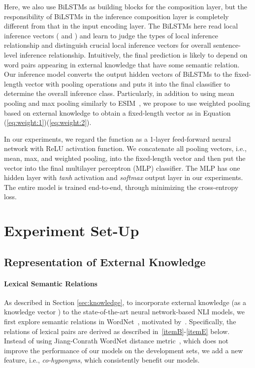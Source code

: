 \documentclass[11pt,a4paper]{article}
\begin{document}
Here, we also use BiLSTMs as building blocks for the composition layer, but the responsibility of BiLSTMs in the inference composition layer is completely different from that in the input encoding layer. The BiLSTMs here read local inference vectors ( and ) and learn to judge the types of local inference relationship and distinguish crucial local inference vectors for overall sentence-level inference relationship. Intuitively, the final prediction is likely to depend on word pairs appearing in external knowledge that have some semantic relation.
Our inference model converts the output hidden vectors of BiLSTMs to the fixed-length vector with pooling operations and puts it into the final classifier to determine the overall inference class. Particularly, in addition to using mean pooling and max pooling similarly to ESIM~\citep{DBLP:conf/acl/ChenZLWJI17}, we propose to use weighted pooling based on external knowledge to obtain a fixed-length vector as in Equation (\ref{eq:weight:1})(\ref{eq:weight:2}).  
{\fontsize{10pt}{1.0cm}

}
In our experiments, we regard the function  as a 1-layer feed-forward neural network with ReLU activation function. We concatenate all pooling vectors, i.e., mean, max, and weighted pooling, into the fixed-length vector and then put the vector into the final multilayer perceptron (MLP) classifier. The MLP has one hidden layer with \textit{tanh} activation and \textit{softmax} output layer in our experiments. The entire model is trained end-to-end, through minimizing the cross-entropy loss. 

\section{Experiment Set-Up}
\label{sec:setup}
\subsection{Representation of External Knowledge}
\paragraph{Lexical Semantic Relations} As described in Section \ref{sec:knowledge}, to incorporate external knowledge (as a knowledge vector ) to the state-of-the-art neural network-based NLI models, we first explore semantic relations in WordNet~\citep{DBLP:journals/cacm/Miller95}, motivated by~\citet{MacCartneyThesis}. Specifically, the relations of lexical pairs are derived as described in~\ref{itemB}-\ref{itemE} below. Instead of using Jiang-Conrath WordNet distance metric~\citep{DBLP:conf/rocling/JiangC97}, which does not improve the performance of our models on the development sets, we add a new feature, i.e., \textit{co-hyponyms}, which consistently benefit  our models. 
\end{document}
